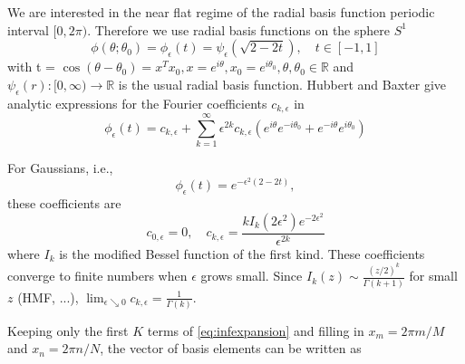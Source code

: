 \documentclass[a4paper,10pt]{article}
\title{}
\author{Vincent Copp\'e}
\begin{document}
\maketitle

\begin{abstract}

\end{abstract}


We are interested in the near flat regime of the radial basis function periodic interval $[0,2\pi)$. Therefore we use radial basis functions on the sphere $S^1$
\begin{equation}
\phi(\theta;\theta_0) = \phi_\epsilon(t) = \psi_\epsilon(\sqrt{2-2t}),\quad t\in [-1,1]
\end{equation}
with t = $\cos(\theta-\theta_0)=x^Tx_0, x=e^{i\theta}, x_0=e^{i\theta_0},\theta,\theta_0\in\mathbb R$ and $\psi_\epsilon(r): [0,\infty)\rightarrow\mathbb R$ is the usual radial basis function. Hubbert and Baxter \cite{Hubbert2001} give analytic expressions for the Fourier coefficients $c_{k,\epsilon}$ in 
\begin{equation}\label{eq:infexpansion}
	\phi_\epsilon(t) = c_{k,\epsilon} + \sum_{k=1}^\infty\epsilon^{2k}c_{k,\epsilon}\left(e^{i\theta}e^{-i\theta_0}+e^{-i\theta}e^{i\theta_0}\right)
\end{equation}

For Gaussians, i.e., 
\begin{equation}
	\phi_\epsilon(t) = e^{-\epsilon^2(2-2t)},
\end{equation}
these coefficients are 
\begin{equation}
c_{0,\epsilon} =0,\quad
	c_{k,\epsilon} = \frac{kI_k(2\epsilon^2)e^{-2\epsilon^2}}{\epsilon^{2k}}
\end{equation}
where $I_k$ is the modified Bessel function of the first kind. These coefficients converge to finite numbers when $\epsilon$ grows small.  Since $I_k(z)\sim \tfrac{(z/2)^k}{\Gamma(k+1)}$ for small $z$ (HMF, ...), $\lim_{\epsilon\searrow0}c_{k,\epsilon}=\frac{1}{\Gamma(k)}$.

Keeping only the first $K$ terms of \eqref{eq:infexpansion} and filling in $x_m=2\pi m/M$ and $x_n=2\pi n/N$, the vector of basis elements can be written as
\end{document}
